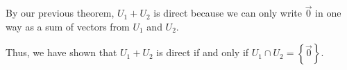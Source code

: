{{		By our previous theorem, \(U_1 + U_2\) is direct because we can only write \(\vec{0}\) in one way as a sum of vectors from \(U_1\) and \(U_2\).
	}

	Thus, we have shown that \(U_1 + U_2\) is direct if and only if \(U_1 \cap U_2 = \left\{ \vec{0} \right\} \).
}

